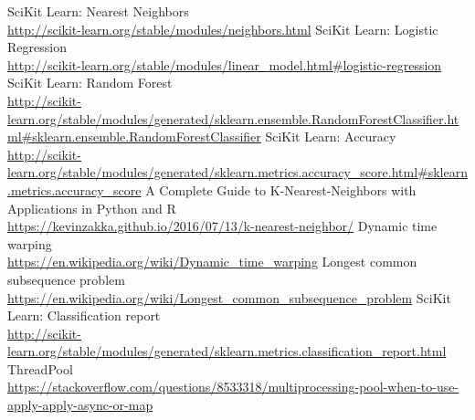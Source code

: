 \documentclass[12pt]{article}
\begin{document}
	\newpage
	\begin{thebibliography}{30}
		SciKit Learn: Nearest Neighbors \\
		 \url{http://scikit-learn.org/stable/modules/neighbors.html}
		  SciKit Learn: Logistic Regression \\
		 \url{http://scikit-learn.org/stable/modules/linear_model.html#logistic-regression}
		  SciKit Learn: Random Forest \\
		 \url{http://scikit-learn.org/stable/modules/generated/sklearn.ensemble.RandomForestClassifier.html#sklearn.ensemble.RandomForestClassifier}
		  SciKit Learn: Accuracy \\
		 \url{http://scikit-learn.org/stable/modules/generated/sklearn.metrics.accuracy_score.html#sklearn.metrics.accuracy_score}
		 A Complete Guide to K-Nearest-Neighbors with Applications in Python and R \\
		 \url{https://kevinzakka.github.io/2016/07/13/k-nearest-neighbor/}
		  Dynamic time warping \\
		 \url{https://en.wikipedia.org/wiki/Dynamic_time_warping}
		  Longest common subsequence problem \\
		 \url{https://en.wikipedia.org/wiki/Longest_common_subsequence_problem}
		  SciKit Learn: Classification report \\
		 \url{http://scikit-learn.org/stable/modules/generated/sklearn.metrics.classification_report.html}
		  ThreadPool \\
		 \url{https://stackoverflow.com/questions/8533318/multiprocessing-pool-when-to-use-apply-apply-async-or-map}
    \end{thebibliography}
	
\end{document}
